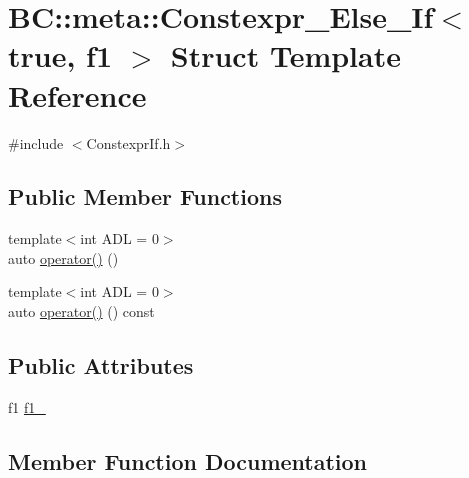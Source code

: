 \hypertarget{structBC_1_1meta_1_1Constexpr__Else__If_3_01true_00_01f1_01_4}{}\section{BC\+:\+:meta\+:\+:Constexpr\+\_\+\+Else\+\_\+\+If$<$ true, f1 $>$ Struct Template Reference}
\label{structBC_1_1meta_1_1Constexpr__Else__If_3_01true_00_01f1_01_4}


{\ttfamily \#include $<$Constexpr\+If.\+h$>$}

\subsection*{Public Member Functions}
\begin{DoxyCompactItemize}
\item 
{\footnotesize template$<$int A\+DL = 0$>$ }\\auto \hyperlink{structBC_1_1meta_1_1Constexpr__Else__If_3_01true_00_01f1_01_4_a6e86bf793d0c3f203a6e36b0fba5013e}{operator()} ()
\item 
{\footnotesize template$<$int A\+DL = 0$>$ }\\auto \hyperlink{structBC_1_1meta_1_1Constexpr__Else__If_3_01true_00_01f1_01_4_aac738db209de998139b52e5b8dab8b3e}{operator()} () const 
\end{DoxyCompactItemize}
\subsection*{Public Attributes}
\begin{DoxyCompactItemize}
\item 
f1 \hyperlink{structBC_1_1meta_1_1Constexpr__Else__If_3_01true_00_01f1_01_4_a484f0fbfd7700b7e220af1c8f5acc14a}{f1\+\_\+}
\end{DoxyCompactItemize}


\subsection{Member Function Documentation}
